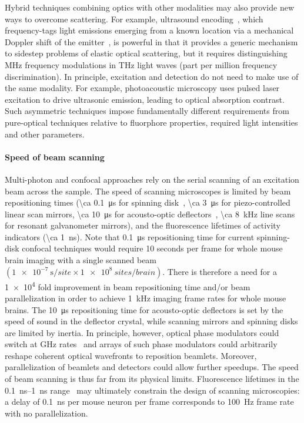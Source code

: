 Hybrid techniques combining optics with other modalities may also provide new ways to overcome scattering.
For example, ultrasound encoding~\cite{wang12}, which frequency-tags light emissions emerging from a known location via a mechanical Doppler shift of the emitter~\cite{mahan98}, is powerful in that it provides a generic mechanism to sidestep problems of elastic optical scattering, but it requires distinguishing MHz frequency modulations in THz light waves (part per million frequency discrimination). In principle, excitation and detection do not need to make use of the same modality. For example, photoacoustic microscopy \cite{filonov12} uses pulsed laser excitation to drive ultrasonic emission, leading to optical absorption contrast. Such asymmetric techniques impose fundamentally different requirements from pure-optical techniques relative to fluorphore properties, required light intensities and other parameters.

\paragraph{Speed of beam scanning}
Multi-photon and confocal approaches rely on the serial scanning of an excitation beam across the sample.
The speed of scanning microscopes is limited by beam repositioning times (\SI{\ca 0.1}{\micro\second} for spinning disk~\cite{mahalati13,kang10,flusberg05}, \SI{\ca 3}{\micro\second} for piezo-controlled linear scan mirrors, \SI{\ca 10}{\micro\second} for acousto-optic deflectors~\cite{vucinic07}, \SI{\ca 8}{\kilo\hertz} line scans for resonant galvanometer mirrors), and the fluorescence lifetimes of activity indicators (\SI{\ca 1}{\nano\second}).
Note that \SI{0.1}{\micro\second} repositioning time for current spinning-disk confocal techniques would require 10 seconds per frame for whole mouse brain imaging with a single scanned beam $\left(\SI{1e-7}{\second\per site}\times\SI{1e8}{sites\per brain}\right)$. There is therefore a need for a \num{1e4} fold improvement in beam repositioning time and/or beam parallelization in order to achieve \SI{1}{\kilo\hertz} imaging frame rates for whole mouse brains.
The \SI{10}{\micro\second} repositioning time for acousto-optic deflectors is set by the speed of sound in the deflector crystal, while scanning mirrors and spinning disks are limited by inertia.
In principle, however, optical phase modulators could switch at GHz rates~\cite{alivisatos13} and arrays of such phase modulators could arbitrarily reshape coherent optical wavefronts to reposition beamlets.
Moreover, parallelization of beamlets and detectors could allow further speedups.
The speed of beam scanning is thus far from its physical limits.
Fluorescence lifetimes in the \SIrange{0.1}{1}{\nano\second} range~\cite{striker99} may ultimately constrain the design of scanning microscopies: a delay of \SI{0.1}{\nano\second} per mouse neuron per frame corresponds to \SI{100}{\hertz} frame rate with no parallelization.

